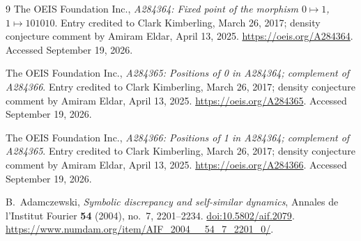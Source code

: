 \documentclass[11pt]{article}
\numberwithin{equation}{section}
\theoremstyle{definition}
\theoremstyle{remark}
\begin{document}
\clearpage
{}
{}
\begin{thebibliography}{9}
The OEIS Foundation Inc., \emph{A284364: Fixed point of the morphism
$0\mapsto1$, $1\mapsto101010$}. Entry credited to Clark Kimberling,
March 26, 2017; density conjecture comment by Amiram Eldar, April 13, 2025.
\url{https://oeis.org/A284364}. Accessed September 19, 2026.

The OEIS Foundation Inc., \emph{A284365: Positions of 0 in A284364;
complement of A284366}. Entry credited to Clark Kimberling,
March 26, 2017; density conjecture comment by Amiram Eldar, April 13, 2025.
\url{https://oeis.org/A284365}. Accessed September 19, 2026.

The OEIS Foundation Inc., \emph{A284366: Positions of 1 in A284364;
complement of A284365}. Entry credited to Clark Kimberling,
March 26, 2017; density conjecture comment by Amiram Eldar, April 13, 2025.
\url{https://oeis.org/A284366}. Accessed September 19, 2026.

B.~Adamczewski, \emph{Symbolic discrepancy and self-similar dynamics},
Annales de l'Institut Fourier \textbf{54} (2004), no.~7, 2201--2234.
\href{https://doi.org/10.5802/aif.2079}{doi:10.5802/aif.2079}.
\url{https://www.numdam.org/item/AIF_2004__54_7_2201_0/}.
\end{thebibliography}
\end{document}
